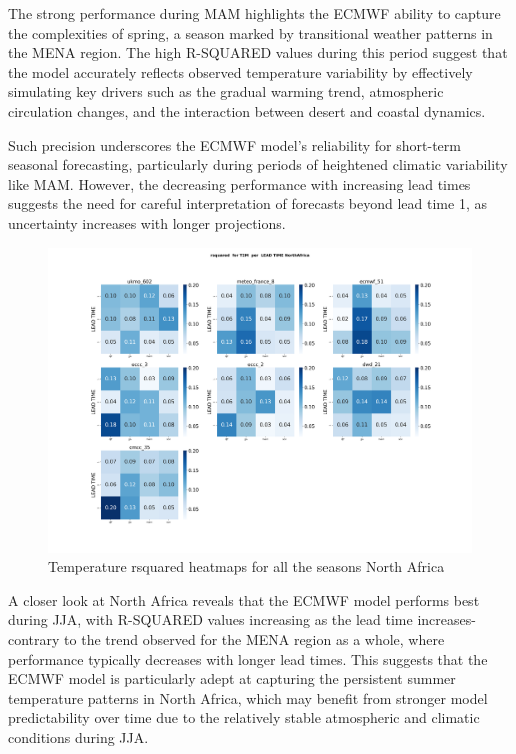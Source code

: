 The strong performance during MAM highlights the ECMWF ability to capture the complexities of spring, a season marked by transitional weather patterns in the MENA region. The high R-SQUARED values during this period suggest that the model accurately reflects observed temperature variability by effectively simulating key drivers such as the gradual warming trend, atmospheric circulation changes, and the interaction between desert and coastal dynamics.

Such precision underscores the ECMWF model's reliability for short-term seasonal forecasting, particularly during periods of heightened climatic variability like MAM. However, the decreasing performance with increasing lead times suggests the need for careful interpretation of forecasts beyond lead time 1, as uncertainty increases with longer projections.

\begin{figure}[H]
    \centering
    \includegraphics[width=1\linewidth]{plots/det/rsquared/rsquared_T2M_NorthAfrica.png}
    \caption{Temperature rsquared heatmaps for all the seasons North Africa}
\end{figure}
A closer look at North Africa reveals that the ECMWF model performs best during JJA, with R-SQUARED values increasing as the lead time increases-contrary to the trend observed for the MENA region as a whole, where performance typically decreases with longer lead times. This suggests that the ECMWF model is particularly adept at capturing the persistent summer temperature patterns in North Africa, which may benefit from stronger model predictability over time due to the relatively stable atmospheric and climatic conditions during JJA.

